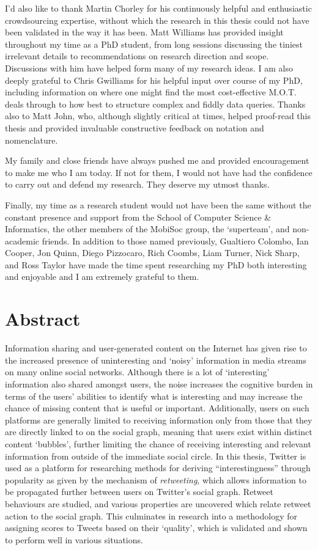 I'd also like to thank Martin Chorley for his continuously helpful and enthusiastic crowdsourcing expertise, without which the research in this thesis could not have been validated in the way it has been. Matt Williams has provided insight throughout my time as a PhD student, from long sessions discussing the tiniest irrelevant details to recommendations on research direction and scope. Discussions with him have helped form many of my research ideas. I am also deeply grateful to Chris Gwilliams for his helpful input over course of my PhD, including information on where one might find the most cost-effective M.O.T. deals through to how best to structure complex and fiddly data queries. Thanks also to Matt John, who, although slightly critical at times, helped proof-read this thesis and provided invaluable constructive feedback on notation and nomenclature.

My family and close friends have always pushed me and provided encouragement to make me who I am today. If not for them, I would not have had the confidence to carry out and defend my research. They deserve my utmost thanks.

Finally, my time as a research student would not have been the same without the constant presence and support from the School of Computer Science \& Informatics, the other members of the MobiSoc group, the `superteam', and non-academic friends. In addition to those named previously, Gualtiero Colombo, Ian Cooper, Jon Quinn, Diego Pizzocaro, Rich Coombs, Liam Turner, Nick Sharp, and Ross Taylor have made the time spent researching my PhD both interesting and enjoyable and I am extremely grateful to them.





\chapter*{Abstract}
Information sharing and user-generated content on the Internet has given rise to the increased presence of uninteresting and `noisy' information in media streams on many online social networks. Although there is a lot of `interesting' information also shared amongst users, the noise increases the cognitive burden in terms of the users' abilities to identify what is interesting and may increase the chance of missing content that is useful or important.
Additionally, users on such platforms are generally limited to receiving information only from those that they are directly linked to on the social graph, meaning that users exist within distinct content `bubbles', further limiting the chance of receiving interesting and relevant information from outside of the immediate social circle. 
In this thesis, Twitter is used as a platform for researching methods for deriving ``interestingness'' through popularity as given by the mechanism of \textit{retweeting}, which allows information to be propagated further between users on Twitter's social graph. Retweet behaviours are studied, and various properties are uncovered which relate retweet action to the social graph. This culminates in research into a methodology for assigning scores to Tweets based on their `quality', which is validated and shown to perform well in various situations.


